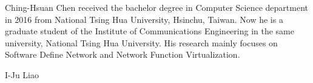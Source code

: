 \documentclass[journal]{IEEEtran}
\begin{document}
\begin{IEEEbiography}
{Ching-Hsuan Chen} received the bachelor degree in Computer Science department in 2016 from National Tsing Hua University, Hsinchu, Taiwan. Now he is a graduate student of the Institute of Communications Engineering in the same university, National Tsing Hua University. His research mainly focuses on Software Define Network and Network Function Virtualization.
\end{IEEEbiography}

\begin{IEEEbiography}
{I-Ju Liao}
\end{IEEEbiography}
\end{document}
